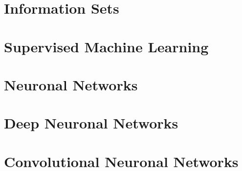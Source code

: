 \documentclass[a4paper]{article}
\begin{document}
		
		
	
	\section{Information Sets}
	
	
	
	\section{Supervised Machine Learning}
	
	
	
	\section{Neuronal Networks}
	
	
	
	\section{Deep Neuronal Networks}
	
	
	
	\section{Convolutional Neuronal Networks}
	
	
\end{document}
